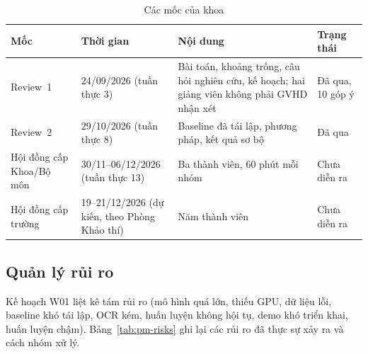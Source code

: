 \begin{table}[htbp]
\caption{Các mốc của khoa}
\label{tab:pm-milestones}
\centering
\small
\begin{tabular}{p{}p{}p{}p{}}
\toprule
\textbf{Mốc} & \textbf{Thời gian} & \textbf{Nội dung} & \textbf{Trạng thái} \\
\midrule
Review~1 & 24/09/2026 (tuần thực 3) & Bài toán, khoảng trống, câu hỏi nghiên cứu, kế hoạch; hai giảng viên không phải GVHD nhận xét & Đã qua, 10 góp ý \\
Review~2 & 29/10/2026 (tuần thực 8) & Baseline đã tái lập, phương pháp, kết quả sơ bộ & Đã qua \\
Hội đồng cấp Khoa/Bộ môn & 30/11--06/12/2026 (tuần thực 13) & Ba thành viên, 60 phút mỗi nhóm & Chưa diễn ra \\
Hội đồng cấp trường & 19--21/12/2026 (dự kiến, theo Phòng Khảo thí) & Năm thành viên & Chưa diễn ra \\
\bottomrule
\end{tabular}
\end{table}

\subsection{Quản lý rủi ro}
\label{sec:pm-risk}

Kế hoạch W01 liệt kê tám rủi ro (mô hình quá lớn, thiếu GPU, dữ liệu lỗi,
baseline khó tái lập, OCR kém, huấn luyện không hội tụ, demo khó triển khai,
huấn luyện chậm). Bảng~\ref{tab:pm-risks} ghi lại các rủi ro đã thực sự xảy ra
và cách nhóm xử lý.

